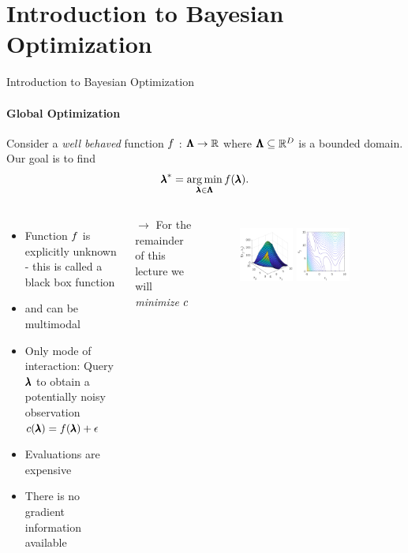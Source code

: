 \section{Introduction to Bayesian Optimization}
\begin{frame}[c]{Introduction to Bayesian Optimization}
\framesubtitle{Global Optimization}

Consider a \emph{well behaved} function $f$ : $\pmb{\Lambda} \rightarrow \mathbb{R}$ where $\pmb{\Lambda} \subseteq \mathbb{R}^D$ is a bounded domain. Our goal is to find
%
\begin{equation*}
  {\pmb{\lambda}}^*=\operatorname*{arg\,min}_{\pmb{\lambda}\in\pmb{\Lambda}} f(\pmb{\lambda}).
\end{equation*}
\vspace{-0.6cm}

\begin{columns}[T]
\begin{itemize}
    \item Function $f$ is explicitly unknown - this is called a black box function
    \item and can be multimodal
    \item Only mode of interaction: Query $\pmb{\lambda}$ to obtain a potentially noisy observation $c(\pmb{\lambda}) = f(\pmb{\lambda}) + \epsilon$
    \item Evaluations are expensive
    \item There is no gradient information available
\end{itemize}
$\rightarrow$ For the remainder of this lecture we will \emph{minimize} $c$
%
\begin{figure}
   \begin{multicols}{2}
    \includegraphics[width=0.4\textwidth, right]{images/intro_images/branin.png}
    \includegraphics[width=0.4\textwidth,left]{images/intro_images/branin_countour.png}
 \end{multicols}
\end{figure}
\end{columns}
\end{frame}
